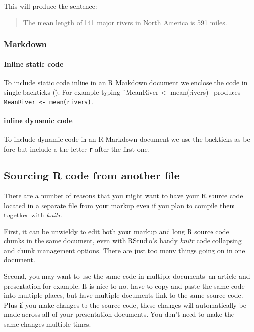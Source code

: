 \documentclass[ChapterTOCs,krantz1]{krantz}\usepackage{graphicx, color}
\begin{document}
\noindent This will produce the sentence:

\begin{quote}
    The mean length of 141 major rivers in North America is 591 miles. 
\end{quote}

\subsubsection{Markdown}

\paragraph{Inline static code}

To include static code inline in an R Markdown document we enclose the code in single backticks (\` \`). For example typing \`\ MeanRiver \textless- mean(rivers) \`\ produces {\tt{MeanRiver \textless- mean(rivers)}}.

\paragraph{inline dynamic code}

To include dynamic code in an R Markdown document we use the backticks as be fore but include a the letter \texttt{r} after the first one.

\subsection{Sourcing R code from another file}

There are a number of reasons that you might want to have your R source code located in a separate file from your markup even if you plan to compile them together with {\emph{knitr}}.

First, it can be unwieldy to edit both your markup and long R source code chunks in the same document, even with RStudio's handy {\emph{knitr}} code collapsing and chunk management options. There are just too many things going on in one document.

Second, you may want to use the same code in multiple documents--an
article and presentation for example. It is nice to not have to copy and
paste the same code into multiple places, but have multiple documents
link to the same source code. Plus if you make changes to the source
code, these changes will automatically be made across all of your
presentation documents. You don't need to make the same changes multiple
times.
\end{document}

